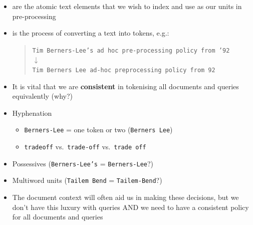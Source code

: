 \documentclass[a4paper,landscape,headrule,footrule,xetex]{foils}
\begin{document}


\begin{itemize}
\item {} are the atomic text elements that we wish to
  index and use as our units in pre-processing
\item {} is the process of converting a text into tokens, e.g.:
  \begin{quote}
    \texttt{Tim Berners-Lee's ad hoc pre-processing policy from '92}\\
    \hspace*{7cm}$\downarrow$\\
    \texttt{Tim Berners Lee ad-hoc preprocessing policy from 92}\\
  \end{quote}
\item It is vital that we are \textbf{consistent} in tokenising all
  documents and queries equivalently (why?)
\end{itemize}







\begin{itemize}
\item Hyphenation
  \begin{itemize}
  \item \texttt{Berners-Lee} = one token or two (\texttt{Berners Lee})
  \item \texttt{tradeoff} vs.\ \texttt{trade-off} vs.\ \texttt{trade off}
  \end{itemize}
\item Possessives (\texttt{Berners-Lee's} = \texttt{Berners-Lee}?)
\item Multiword units (\texttt{Tailem Bend} = \texttt{Tailem-Bend}?)
\item The document context will often aid us in making these decisions,
  but we don't have this luxury with queries AND we need to have a
  consistent policy for all documents and queries
\end{itemize}







\end{document}

